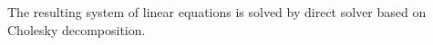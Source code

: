 The resulting system of linear equations is solved by direct solver based on Cholesky decomposition.






